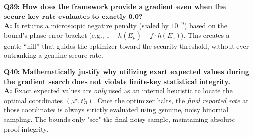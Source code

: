 \documentclass[11pt, a4paper]{article}
\begin{document}
\textbf{Q39: How does the framework provide a gradient even when the secure key rate evaluates to exactly 0.0?} \\
\textbf{A:} It returns a microscopic negative penalty (scaled by $10^{-9}$) based on the bound's phase-error bracket (e.g., $1 - h(E_p) - f \cdot h(E_z)$). This creates a gentle ``hill'' that guides the optimizer toward the security threshold, without ever outranking a genuine secure rate.

\textbf{Q40: Mathematically justify why utilizing exact expected values during the gradient search does not violate finite-key statistical integrity.} \\
\textbf{A:} Exact expected values are \textit{only} used as an internal heuristic to locate the optimal coordinates $(\mu^\star, t_B^\star)$. Once the optimizer halts, the \textit{final reported rate} at those coordinates is always strictly evaluated using genuine, noisy binomial sampling. The bounds only "see" the final noisy sample, maintaining absolute proof integrity.
\end{document}
